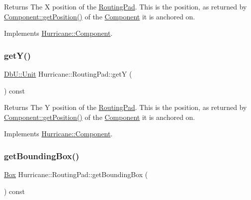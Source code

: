 \begin{DoxyReturn}{Returns}
The X position of the \hyperlink{classHurricane_1_1RoutingPad}{Routing\+Pad}. This is the position, as returned by \hyperlink{classHurricane_1_1Component_aa4e9a47c89fe701670ca34355195d519}{Component\+::get\+Position()} of the \hyperlink{classHurricane_1_1Component}{Component} it is anchored on. 
\end{DoxyReturn}


Implements \hyperlink{classHurricane_1_1Component_a0f8299ed73705fd4fbf56589dcc7e074}{Hurricane\+::\+Component}.

\mbox{\label{classHurricane_1_1RoutingPad_aede4c04a7f893b1e5478b164b6eaae2d}} 
\subsubsection{\texorpdfstring{get\+Y()}{getY()}}
{\footnotesize\ttfamily \hyperlink{group__DbUGroup_ga4fbfa3e8c89347af76c9628ea06c4146}{Db\+U\+::\+Unit} Hurricane\+::\+Routing\+Pad\+::getY (\begin{DoxyParamCaption}{ }\end{DoxyParamCaption}) const\hspace{0.3cm}{\ttfamily [virtual]}}

\begin{DoxyReturn}{Returns}
The Y position of the \hyperlink{classHurricane_1_1RoutingPad}{Routing\+Pad}. This is the position, as returned by \hyperlink{classHurricane_1_1Component_aa4e9a47c89fe701670ca34355195d519}{Component\+::get\+Position()} of the \hyperlink{classHurricane_1_1Component}{Component} it is anchored on. 
\end{DoxyReturn}


Implements \hyperlink{classHurricane_1_1Component_a727da3f127c3a7a0a09468219f98c3e6}{Hurricane\+::\+Component}.

\mbox{\label{classHurricane_1_1RoutingPad_a2cc2894b5e1c82b725dedcf1978dc773}} 
\subsubsection{\texorpdfstring{get\+Bounding\+Box()}{getBoundingBox()}}
{\footnotesize\ttfamily \hyperlink{classHurricane_1_1Box}{Box} Hurricane\+::\+Routing\+Pad\+::get\+Bounding\+Box (\begin{DoxyParamCaption}{ }\end{DoxyParamCaption}) const\hspace{0.3cm}{\ttfamily [virtual]}}

